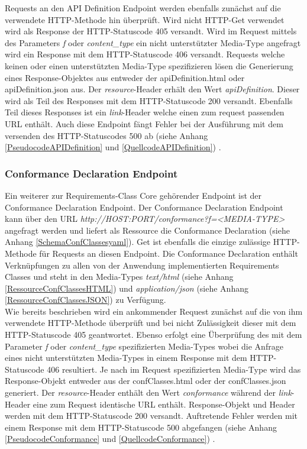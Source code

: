 Requests an den API Definition Endpoint werden ebenfalls zunächst auf die verwendete HTTP-Methode hin überprüft. Wird nicht HTTP-Get verwendet wird als 
Response der HTTP-Statuscode 405 versandt. Wird im Request mittels des Parameters \textit{f} 
oder \textit{content\_type} ein nicht unterstützter Media-Type angefragt wird ein Response mit dem HTTP-Statuscode 406 versandt. 
Requests welche keinen oder einen unterstützten Media-Type spezifizieren lösen die Generierung eines Response-Objektes aus entweder der apiDefinition.html oder 
apiDefinition.json aus. Der \textit{resource}-Header erhält den Wert \textit{apiDefinition}. Dieser wird als Teil des Responses mit dem HTTP-Statuscode 200 versandt.
Ebenfalls Teil dieses Responses ist ein \textit{link}-Header welche einen zum request passenden URL enthält. Auch diese Endpoint fängt Fehler bei der
Ausführung mit dem versenden des HTTP-Statuscodes 500 ab (siehe Anhang \ref{PseudocodeAPIDefinition} und \ref{QuellcodeAPIDefinition}) 
\cite{ogc_api_processes_core}. 

\subsubsection{Conformance Declaration Endpoint}
Ein weiterer zur Requirements-Class Core gehörender Endpoint ist der Conformance Declaration Endpoint.
Der Conformance Declaration Endpoint kann über den URL \textit{http://HOST:PORT/conformance?f=<MEDIA-TYPE>} angefragt werden und liefert als 
Ressource die Conformance Declaration (siehe Anhang \ref{SchemaConfClassesyaml}). Get ist ebenfalls die einzige zulässige HTTP-Methode für Requests an diesen Endpoint.
Die Conformance Declaration enthält Verknüpfungen zu allen von der Anwendung implementierten Requirements Classes und steht in den Media-Types \textit{text/html} 
(siehe Anhang \ref{RessourceConfClassesHTML}) und \textit{application/json} (siehe Anhang \ref{RessourceConfClassesJSON}) zu Verfügung.\\

Wie bereits beschrieben wird ein ankommender Request zunächst auf die von ihm verwendete HTTP-Methode überprüft und bei nicht Zulässigkeit dieser mit dem 
HTTP-Statuscode 405 geantwortet. Ebenso erfolgt eine Überprüfung des mit dem Parameter \textit{f} oder \textit{content\_type}
spezifizierten Media-Types wobei die Anfrage eines nicht unterstützten Media-Types in einem 
Response mit dem HTTP-Statuscode 406 resultiert. Je nach im Request spezifizierten Media-Type wird das Response-Objekt entweder aus der confClasses.html oder 
der confClasses.json generiert. Der \textit{resource}-Header
enthält den Wert \textit{conformance} während der \textit{link}-Header eine zum Request identische URL enthält. Response-Objekt und Header werden mit dem 
HTTP-Statuscode 200 versandt. Auftretende Fehler werden mit einem Response mit dem HTTP-Statuscode 500 abgefangen
(siehe Anhang \ref{PseudocodeConformance} und \ref{QuellcodeConformance}) \cite{ogc_api_processes_core}.


